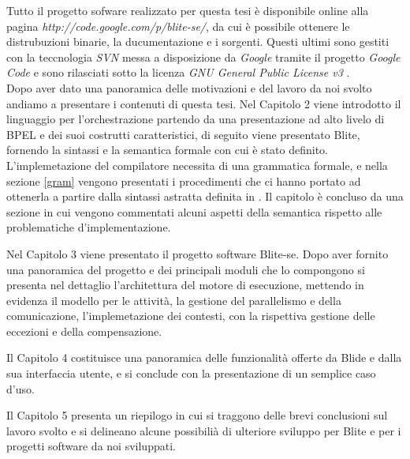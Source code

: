 Tutto il progetto sofware realizzato per questa tesi è disponibile online alla
pagina \emph{http://code.google.com/p/blite-se/}, da cui è possibile ottenere le
distrubuzioni binarie, la ducumentazione e i sorgenti. Questi ultimi sono
gestiti con la teccnologia \emph{SVN} \cite{SVN} messa a disposizione da
\emph{Google} tramite il progetto \emph{Google Code} \cite{GCode} e sono rilasciati
sotto la licenza \emph{GNU General Public License v3} \cite{GPLv3}.
\\

% 

Dopo aver dato una panoramica delle motivazioni e del lavoro da noi svolto
andiamo a presentare i contenuti di questa tesi. Nel Capitolo 2 viene introdotto
il linguaggio per l'orchestrazione partendo da una presentazione ad alto livelo
di BPEL e dei suoi costrutti caratteristici, di seguito viene presentato Blite,
fornendo la sintassi e la semantica formale con cui è stato definito.
L'implemetazione del compilatore necessita di una grammatica formale, e nella
sezione \ref{gram} vengono presentati i procedimenti che ci hanno portato ad
ottenerla a partire dalla sintassi astratta definita in \cite{LaPuTie1}. Il capitolo
è concluso da una sezione in cui vengono commentati alcuni aspetti della
semantica rispetto alle problematiche d'implementazione.

Nel Capitolo 3 viene presentato il progetto software Blite-se. Dopo aver
fornito una panoramica del progetto e dei principali moduli che lo compongono si
presenta nel dettaglio l'architettura del motore di esecuzione, mettendo in
evidenza il modello per le attività, la gestione del parallelismo e della
comunicazione, l'implemetazione dei contesti, con la rispettiva gestione delle
eccezioni e della compensazione.

Il Capitolo 4 costituisce una panoramica delle funzionalità offerte da Blide e
dalla sua interfaccia utente, e si conclude con la presentazione di un semplice
caso d'uso. 

Il Capitolo 5 presenta un riepilogo in cui si traggono delle brevi
conclusioni sul lavoro svolto e si delineano alcune possibilià di ulteriore
sviluppo per Blite e per i progetti software da noi sviluppati.
